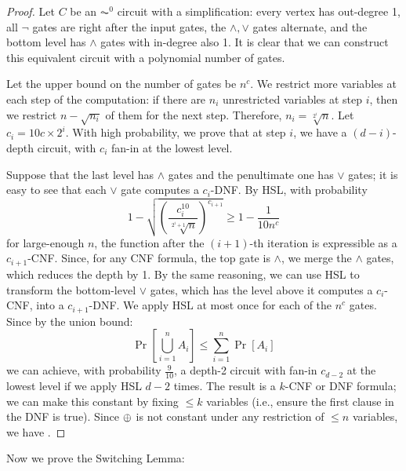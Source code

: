 \begin{proof}
Let $C$ be an $\AC^0$ circuit with a simplification: every vertex has out-degree 1, all $\neg$ gates are right after the input gates, the $\wedge, \vee$ gates alternate, and the bottom level has $\wedge$ gates with in-degree also 1. It is clear that we can construct this equivalent circuit with a polynomial number of gates.

\par Let the upper bound on the number of gates be $n^c$. We restrict more variables at each step of the computation: if there are $n_i$ unrestricted variables at step $i$, then we restrict $n-\sqrt{n_i}$ of them for the next step. Therefore, $n_i = \sqrt[2^i]{n}$. Let $c_i = 10c \times 2^i$. With high probability, we prove that at step $i$, we have a $(d-i)$-depth circuit, with $c_i$ fan-in at the lowest level. 

\par Suppose that the last level has $\wedge$ gates and the penultimate one has $\vee$ gates; it is easy to see that each $\vee$ gate computes a $c_i$-DNF. By HSL, with probability
\[
1-\sqrt{\left(\frac{c_i^{10}}{\sqrt[2^i+1]{n}}\right)^{c_{i+1}}} \ge 1 - \frac{1}{10n^c}
\]
for large-enough $n$, the function after the $(i+1)$-th iteration is expressible as a $c_{i+1}$-CNF. Since, for any CNF formula, the top gate is $\wedge$, we merge the $\wedge$ gates, which reduces the depth by 1. By the same reasoning, we can use HSL to transform the bottom-level $\vee$ gates, which has the level above it computes a $c_i$-CNF, into a $c_{i+1}$-DNF. We apply HSL at most once for each of the $n^c$ gates. Since by the union bound:
\[
\Pr[\bigcup_{i=1}^n A_i] \le \sum_{i=1}^n \Pr[A_i]
\]
we can achieve, with probability $\frac{9}{10}$, a depth-2 circuit with fan-in $c_{d-2}$ at the lowest level if we apply HSL $d-2$ times. The result is a $k$-CNF or DNF formula; we can make this constant by fixing $\le k$ variables (i.e., ensure the first clause in the DNF is true). Since $\oplus$ is not constant under any restriction of $\le n$ variables, we have .
\end{proof}
Now we prove the Switching Lemma:
